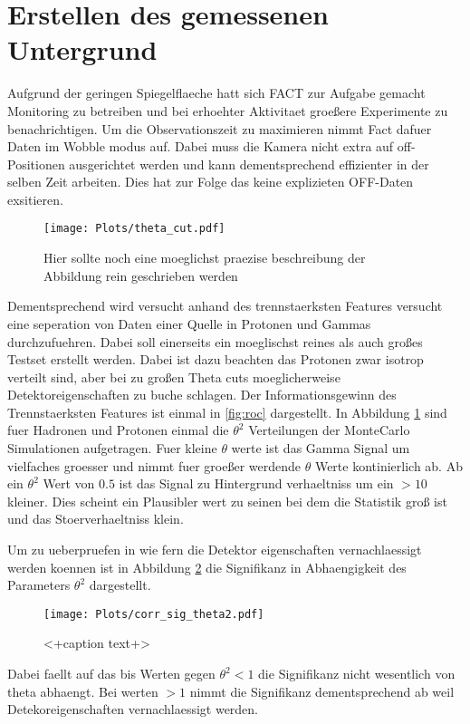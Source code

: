 \section{Erstellen des gemessenen Untergrund}
Aufgrund der geringen Spiegelflaeche hatt sich FACT zur Aufgabe gemacht Monitoring zu betreiben und bei erhoehter Aktivitaet groeßere Experimente zu benachrichtigen.
Um die Observationszeit zu maximieren nimmt Fact dafuer Daten im Wobble modus auf. 
Dabei muss die Kamera nicht extra auf off-Positionen ausgerichtet werden und kann dementsprechend effizienter in der selben Zeit arbeiten. 
Dies hat zur Folge das keine explizieten OFF-Daten exsitieren. 
\begin{figure}[H]
  \centering
  \texttt{[image: Plots/theta\_cut.pdf]}
  \caption{Hier sollte noch eine moeglichst praezise beschreibung der Abbildung rein geschrieben werden}
  \label{fig:thetacut}
\end{figure}
Dementsprechend wird versucht anhand des trennstaerksten Features versucht eine seperation von Daten einer Quelle in Protonen und Gammas durchzufuehren. 
Dabei soll einerseits ein moeglischst reines als auch großes Testset erstellt werden. 
Dabei ist dazu beachten das Protonen zwar isotrop verteilt sind, aber bei zu großen Theta cuts moeglicherweise Detektoreigenschaften zu buche schlagen. 
Der Informationsgewinn des Trennstaerksten Features ist einmal in \ref{fig:roc} dargestellt. In Abbildung \ref{fig:thetacut} sind fuer Hadronen und Protonen einmal die $\theta^{2}$ Verteilungen der MonteCarlo Simulationen aufgetragen. 
Fuer kleine $\theta$ werte ist das Gamma Signal um vielfaches groesser und nimmt fuer groeßer werdende $\theta$ Werte kontinierlich ab. 
Ab ein $\theta^{2}$ Wert von $0.5$ ist das Signal zu Hintergrund verhaeltniss um ein $>10$ kleiner. 
Dies scheint ein Plausibler wert zu seinen bei dem die Statistik groß ist und das Stoerverhaeltniss klein.

Um zu ueberpruefen in wie fern die Detektor eigenschaften vernachlaessigt werden koennen ist in Abbildung \ref{fig:corrtheta} die Signifikanz in Abhaengigkeit des Parameters $\theta^{2}$ dargestellt.
\begin{figure}[H]
  \centering
  \texttt{[image: Plots/corr\_sig\_theta2.pdf]}
  \caption{<+caption text+>}
  \label{fig:corrtheta}
\end{figure}
Dabei faellt auf das bis Werten gegen $\theta^{2} < 1$ die Signifikanz nicht wesentlich von theta abhaengt. Bei werten $>1$ nimmt die Signifikanz dementsprechend ab weil Detekoreigenschaften vernachlaessigt werden.
